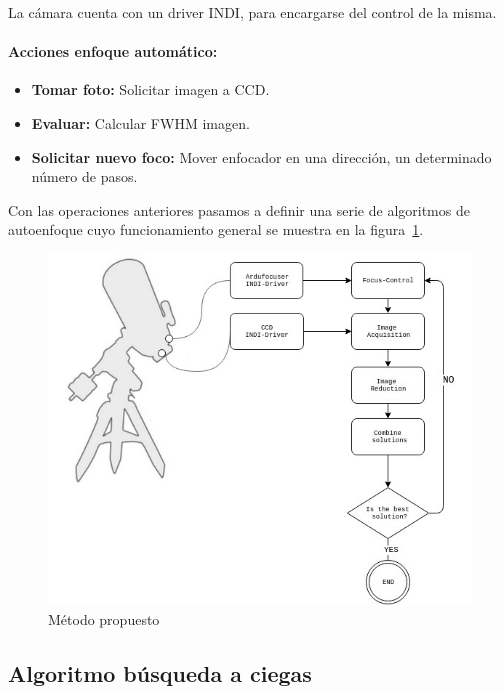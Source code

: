 La cámara cuenta con un driver INDI, para encargarse del control \cite{atik_indi} de la misma.


\paragraph{Acciones enfoque automático:}

\begin{itemize}
	\item \textbf{Tomar foto:} Solicitar imagen a CCD.
	\item \textbf{Evaluar:} Calcular FWHM imagen.
	\item \textbf{Solicitar nuevo foco:} Mover enfocador en una dirección, un determinado número de pasos.  
\end{itemize}

Con las operaciones anteriores pasamos a definir una serie de algoritmos de autoenfoque cuyo funcionamiento general se muestra en la figura~\ref{fig:op_sis}.

\begin{figure}
	\centering
	\includegraphics[width=1\linewidth]{../images/procesamiento_imagen}
	\caption[Diagrama operaciones en el sistema]{ Método propuesto }
	\label{fig:op_sis}
\end{figure}


\subsection{Algoritmo búsqueda a ciegas}

